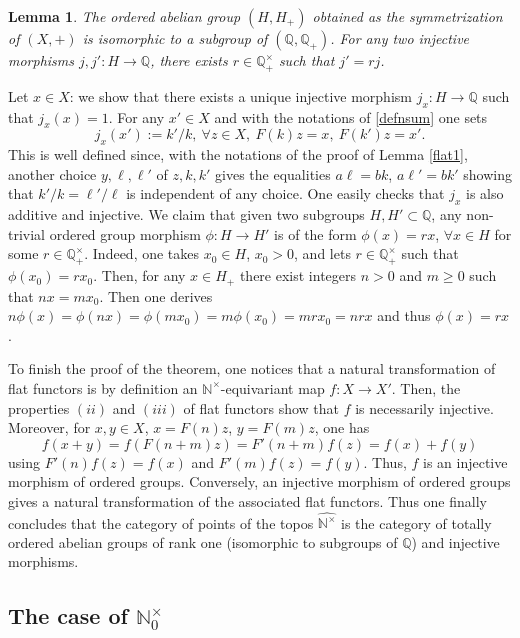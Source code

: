 \documentclass[noams,lp]{compositio}
\newtheorem{lem}[thm]{Lemma}
\def\N{{\mathbb N}}
\def\Q{{\mathbb Q}}
\def\nto{\N_0^{\times}}
\begin{document}
\begin{lem}\label{flat2} The ordered abelian group $(H,H_+)$ obtained as the symmetrization of $(X,+)$ is isomorphic to a subgroup of $(\Q,\Q_+)$. For any two injective morphisms  $j, j': H\to  \Q$, there exists $r\in \Q^\times_+$ such that $j'=rj$.
\end{lem}
\proof
Let $x\in X$: we show that there exists a unique injective morphism $j_x: H\to \Q$  such that $j_x(x)=1$. For any $x'\in X$ and with the notations of \eqref{defnsum} one sets 
$$
j_x(x'):=k'/k, \ \forall z\in X, \  F(k)z=x, \  F(k')z=x'.
$$
This is well defined since, with the notations of the proof of Lemma \ref{flat1}, another choice $y,\ell,\ell'$ of $z,k,k'$ 
gives the equalities $a\ell=bk$, $a\ell'=bk'$ showing that $k'/k=\ell'/\ell$ is independent of any choice. One easily checks that $j_x$ is also additive and injective. \newline 
We claim that given two subgroups $H, H'\subset \Q$, any non-trivial ordered group morphism $\phi:H\to H'$ is of the form $\phi(x)=rx$, $\forall x\in H$ for some $r\in \Q^\times_+$. Indeed, one takes $x_0\in H$, $x_0>0$, and lets $r\in \Q^\times_+$ such that $\phi(x_0)=rx_0$. Then, for any $x\in H_+$ there exist integers $n>0$ and $m\geq 0$ such that $nx=mx_0$. Then one derives $n\phi(x)=\phi(nx)=\phi(mx_0)=m\phi(x_0)=mrx_0=nrx$ and thus $\phi(x)=rx$. \endproof


To finish the proof of the theorem, one notices that a natural transformation of flat functors is by definition an $\N^\times$-equivariant map $f:X\to X'$. Then, the properties $(ii)$ and $(iii)$ of flat functors show that $f$ is necessarily injective. Moreover,  for $x,y\in X$, $x=F(n)z$, $y=F(m)z$, one has  
$$
f(x+y)=f(F(n+m)z)=F'(n+m)f(z)=f(x)+f(y)
$$
using $F'(n)f(z)=f(x)$ and $F'(m)f(z)=f(y)$.
Thus, $f$ is an injective morphism of ordered groups. Conversely, an injective morphism of ordered groups gives a natural transformation of the associated flat functors. Thus one finally concludes that the category of points of the topos $\widehat{ \N^\times} $ is the category of totally ordered abelian groups of rank one (isomorphic to subgroups of $\Q$) and injective morphisms.
\endproof




\subsection{The case of $\nto$}\label{sectnto}
\end{document}
